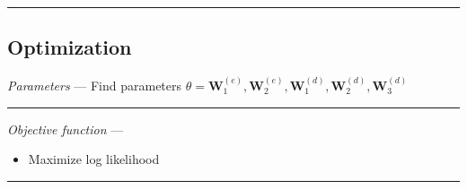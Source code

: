 {\color{black}\hrule height 0.001mm}

\subsection*{Optimization}
\emph{Parameters} --- Find parameters $\theta = \boldsymbol{W}_1^{(e)}, \boldsymbol{W}_2^{(e)}, \boldsymbol{W}_1^{(d)}, \boldsymbol{W}_2^{(d)}, \boldsymbol{W}_3^{(d)}$ 

{\color{lightgray}\hrule height 0.001mm}

\emph{Objective function} --- 
\begin{itemize}
    \item Maximize log likelihood
\end{itemize}

{\color{lightgray}\hrule height 0.001mm}

